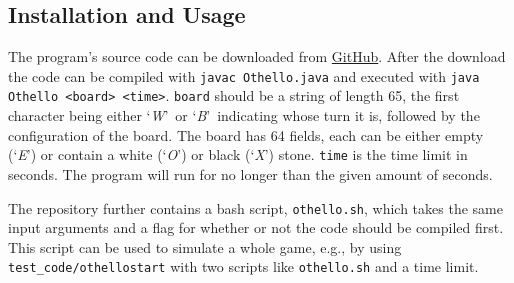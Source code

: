 \subsection{Installation and Usage}
The program's source code can be downloaded from \href{https://github.com/muesal/othello}{GitHub}.
After the download the code can be compiled with \texttt{javac Othello.java} and executed with \texttt{java Othello <board> <time>}.
\texttt{board} should be a string of length 65, the first character being either \lq\textit{W}\rq~or \lq\textit{B}\rq~indicating whose turn it is, followed by the configuration of the board.
The board has 64 fields, each can be either empty (\lq\textit{E}\rq) or contain a white (\lq\textit{O}\rq) or black (\lq\textit{X}\rq) stone.
\texttt{time} is the time limit in seconds.
The program will run for no longer than the given amount of seconds.

The repository further contains a bash script, \texttt{othello.sh}, which takes the same input arguments and a flag for whether or not the code should be compiled first.
This script can be used to simulate a whole game, e.g., by using \texttt{test\_code/othellostart} with two scripts like \texttt{othello.sh} and a time limit.
